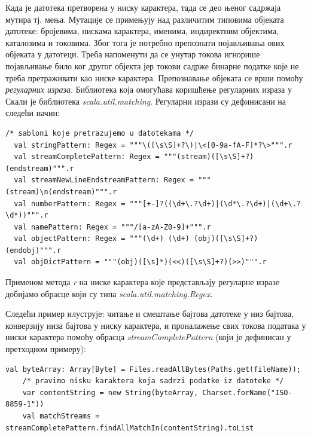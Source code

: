 \documentclass[12pt,oneside]{memoir}
\begin{document}
Када је датотека претворена у ниску карактера, тада се део њеног садржаја мутира тј. мења. Мутације се примењују над различитим типовима објеката датотеке: бројевима, нискама карактера, именима, индиректним објектима, каталозима и токовима. Због тога је потребно препознати појављивања ових објеката у датотеци. Треба напоменути да се унутар токова игнорише појављивање било ког другог објекта јер токови садрже бинарне податке које не треба претраживати као ниске карактера. Препознавање објеката се врши помоћу \textit{регуларних израза}. 
%
Библиотека која омогућава коришћење регуларних израза у Скали је библиотека \textit{scala.util.matching}. Регуларни изрази су дефинисани на следећи начин:

\begin{lstlisting}[frame=single]
    /* sabloni koje pretrazujemo u datotekama */
  val stringPattern: Regex = """\([\s\S]+?\)|\<[0-9a-fA-F]*?\>""".r
  val streamCompletePattern: Regex = """(stream)([\s\S]+?)(endstream)""".r
  val streamNewLineEndstreamPattern: Regex = """(stream)\n(endstream)""".r
  val numberPattern: Regex = """[+-]?((\d+\.?\d+)|(\d*\.?\d+)|(\d+\.?\d*))""".r
  val namePattern: Regex = """/[a-zA-Z0-9]+""".r
  val objectPattern: Regex = """(\d+) (\d+) (obj)([\s\S]+?)(endobj)""".r
  val objDictPattern = """(obj)([\s]*)(<<)([\s\S]+?)(>>)""".r    
\end{lstlisting}

Применом метода \textit{r} на ниске карактера које представљају регуларне изразе добијамо обрасце који су типа \textit{scala.util.matching.Regex}.

Следећи пример илуструје: читање и смештање бајтова датотеке у низ бајтова, конверзију низа бајтова у ниску карактера, и проналажење свих токова података у ниски карактера помоћу обрасца \textit{streamCompletePattern} (који је дефинисан у претходном примеру):

\begin{lstlisting}[frame=single]
    val byteArray: Array[Byte] = Files.readAllBytes(Paths.get(fileName));
    /* pravimo nisku karaktera koja sadrzi podatke iz datoteke */
    var contentString = new String(byteArray, Charset.forName("ISO-8859-1"))
    val matchStreams = streamCompletePattern.findAllMatchIn(contentString).toList
\end{lstlisting}
\end{document}
